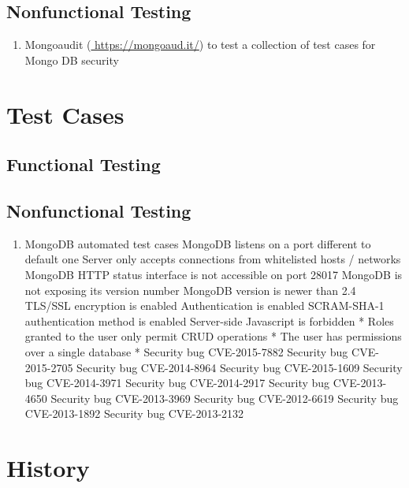 \documentclass[11pt]{article}
\begin{document}
		\subsection{Nonfunctional Testing}
			\begin{enumerate}
				\item Mongoaudit (\url{ https://mongoaud.it/}) to test a collection of test cases for Mongo DB security
			\end{enumerate}
	\section{Test Cases}
		\subsection{Functional Testing}
		\subsection{Nonfunctional Testing}
			\begin{enumerate}
				\item MongoDB automated test cases
					\subitem MongoDB listens on a port different to default one
					\subitem Server only accepts connections from whitelisted hosts / networks
					\subitem MongoDB HTTP status interface is not accessible on port 28017
					\subitem MongoDB is not exposing its version number
					\subitem MongoDB version is newer than 2.4
					\subitem TLS/SSL encryption is enabled
					\subitem Authentication is enabled
					\subitem SCRAM-SHA-1 authentication method is enabled
					\subitem Server-side Javascript is forbidden *
					\subitem Roles granted to the user only permit CRUD operations *
					\subitem The user has permissions over a single database *
					\subitem Security bug CVE-2015-7882
					\subitem Security bug CVE-2015-2705
					\subitem Security bug CVE-2014-8964
					\subitem Security bug CVE-2015-1609
					\subitem Security bug CVE-2014-3971
					\subitem Security bug CVE-2014-2917
					\subitem Security bug CVE-2013-4650
					\subitem Security bug CVE-2013-3969
					\subitem Security bug CVE-2012-6619
					\subitem Security bug CVE-2013-1892
					\subitem Security bug CVE-2013-2132
				\end{enumerate}
		
	\section{History}
\end{document}
